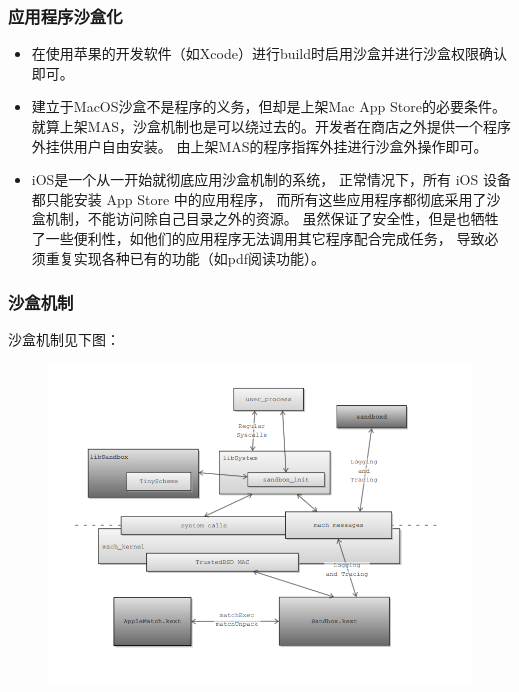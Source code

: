 \documentclass[AutoFakeBold,a4paper]{ctexart}
\begin{document}
\subsubsection{应用程序沙盒化}

\begin{itemize}
    \item 在使用苹果的开发软件（如Xcode）进行build时启用沙盒并进行沙盒权限确认即可。
    \item 建立于MacOS沙盒不是程序的义务，但却是上架Mac App Store的必要条件。
    就算上架MAS，沙盒机制也是可以绕过去的。开发者在商店之外提供一个程序外挂供用户自由安装。
    由上架MAS的程序指挥外挂进行沙盒外操作即可。
    \item iOS是一个从一开始就彻底应用沙盒机制的系统，
    正常情况下，所有 iOS 设备都只能安装 App Store 中的应用程序，
    而所有这些应用程序都彻底采用了沙盒机制，不能访问除自己目录之外的资源。
    虽然保证了安全性，但是也牺牲了一些便利性，如他们的应用程序无法调用其它程序配合完成任务，
    导致必须重复实现各种已有的功能（如pdf阅读功能）。
\end{itemize}

\subsubsection{沙盒机制}

沙盒机制见下图：

\begin{figure}[H]
    \centering
    \includegraphics[width=0.92\columnwidth]{Sandbox_Structure.PNG}
\end{figure}
\end{document}
